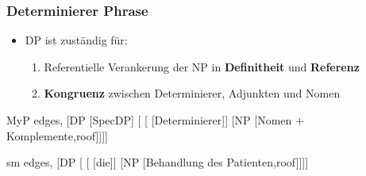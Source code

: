 \begin{frame}
\frametitle{Determinierer Phrase}

	\begin{itemize}
		\item DP ist zuständig für:
		\begin{enumerate}
			\item Referentielle Verankerung der NP in \textbf{Definitheit} und \textbf{Referenz}
			\item \textbf{Kongruenz} zwischen Determinierer, Adjunkten und Nomen
		\end{enumerate}				
	\end{itemize}



\begin{minipage}[b]{0.6\textwidth}
	\centering
	\footnotesize{
		\begin{forest}
		MyP edges,
		[DP [SpecDP]
			[ 	[ [Determinierer]]
						[NP [Nomen $+$ Komplemente,roof]]]]
		\end{forest}
		}
\end{minipage}  
\pause            
\begin{minipage}[b]{0.35\textwidth}
	\centering
	\footnotesize{
		\begin{forest}
		sm edges,
		[DP [ 	[ [die]]
						[NP [Behandlung des Patienten,roof]]]]
		\end{forest}
		}
\end{minipage}  

\end{frame}


